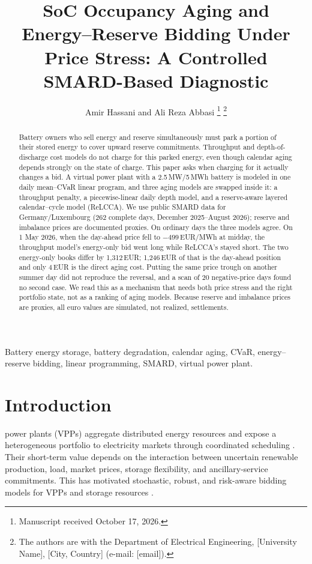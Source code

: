 \documentclass[journal,12pt,twocolumn]{IEEEtran}
\begin{document}
\title{SoC Occupancy Aging and Energy--Reserve Bidding Under Price Stress: A Controlled SMARD-Based Diagnostic}

\author{Amir Hassani and Ali Reza Abbasi
\thanks{Manuscript received October 17, 2026.}
\thanks{The authors are with the Department of Electrical Engineering, [University Name], [City, Country] (e-mail: [email]).}}

\maketitle

\begin{abstract}
Battery owners who sell energy and reserve simultaneously must park a portion of their stored energy to cover upward reserve commitments. Throughput and depth-of-discharge cost models do not charge for this parked energy, even though calendar aging depends strongly on the state of charge. This paper asks when charging for it actually changes a bid. A virtual power plant with a 2.5\,MW/5\,MWh battery is modeled in one daily mean--CVaR linear program, and three aging models are swapped inside it: a throughput penalty, a piecewise-linear daily depth model, and a reserve-aware layered calendar--cycle model (ReLCCA). We use public SMARD data for Germany/Luxembourg (262 complete days, December 2025--August 2026); reserve and imbalance prices are documented proxies. On ordinary days the three models agree. On 1 May 2026, when the day-ahead price fell to $-499$\,EUR/MWh at midday, the throughput model's energy-only bid went long while ReLCCA's stayed short. The two energy-only books differ by 1{,}312\,EUR; 1{,}246\,EUR of that is the day-ahead position and only 4\,EUR is the direct aging cost. Putting the same price trough on another summer day did not reproduce the reversal, and a scan of 20 negative-price days found no second case. We read this as a mechanism that needs both price stress and the right portfolio state, not as a ranking of aging models. Because reserve and imbalance prices are proxies, all euro values are simulated, not realized, settlements.
\end{abstract}

\begin{IEEEkeywords}
Battery energy storage, battery degradation, calendar aging, CVaR, energy--reserve bidding, linear programming, SMARD, virtual power plant.
\end{IEEEkeywords}

\section{Introduction}
 power plants (VPPs) aggregate distributed energy resources and expose a heterogeneous portfolio to electricity markets through coordinated scheduling \cite{Pudjianto2007,Nosratabadi2017,Pandzic2013,Giuntoli2013}. Their short-term value depends on the interaction between uncertain renewable production, load, market prices, storage flexibility, and ancillary-service commitments. This has motivated stochastic, robust, and risk-aware bidding models for VPPs and storage resources \cite{Conejo2010,Baringo2017,Baringo2016,Vahedipour2021}.
\end{document}
